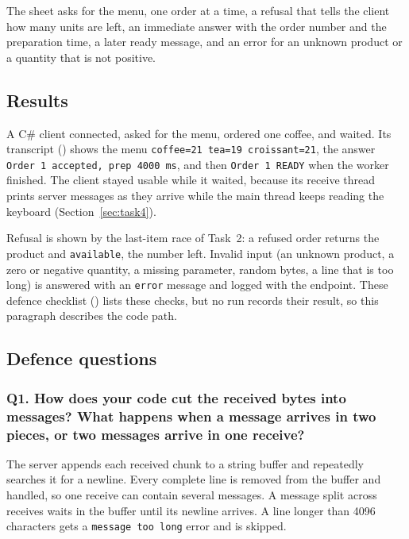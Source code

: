 \documentclass[12pt,a4paper]{article}
\begin{document}
The sheet asks for the menu, one order at a time, a refusal that tells the client
how many units are left, an immediate answer with the order number and the
preparation time, a later ready message, and an error for an unknown product or a
quantity that is not positive.

\subsection{Results}

A C\# client connected, asked for the menu, ordered one coffee, and waited. Its
transcript ()
shows the menu \texttt{coffee=21 tea=19 croissant=21}, the answer
\texttt{Order 1 accepted, prep 4000 ms}, and then \texttt{Order 1 READY} when the
worker finished. The client stayed usable while it waited, because its receive
thread prints server messages as they arrive while the main thread keeps reading
the keyboard (Section~\ref{sec:task4}).

Refusal is shown by the last-item race of Task~2: a refused order returns the
product and \texttt{available}, the number left. Invalid input (an unknown product,
a zero or negative quantity, a missing parameter, random bytes, a line that is too
long) is answered with an \texttt{error} message and logged with the endpoint. These
defence checklist () lists these checks, but no run
records their result, so this paragraph describes the code path.

\subsection{Defence questions}

    \subsubsection{Q1. How does your code cut the received bytes into messages? What happens when a message arrives in two pieces, or two messages arrive in one receive?}
    The server appends each received chunk to a string buffer and repeatedly searches
    it for a newline. Every complete line is removed from the buffer and handled, so
    one receive can contain several messages. A message split across receives waits
    in the buffer until its newline arrives. A line longer than 4096 characters gets
    a \texttt{message too long} error and is skipped.
\end{document}
